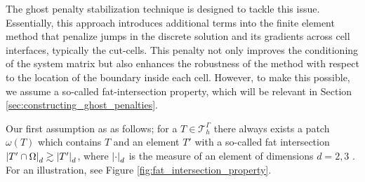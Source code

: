 The ghost penalty stabilization technique is designed to tackle this issue. Essentially, this approach introduces additional terms into the finite element method that penalize jumps in the discrete solution and its gradients across cell interfaces,
typically the cut-cells. This penalty not only improves the conditioning of the system matrix but also enhances the robustness of the method with respect to the location of the boundary inside each cell. However, to make this possible, we assume a
so-called fat-intersection property, which will be relevant in Section \ref{sec:constructing_ghost_penalties}.

Our first assumption as as follows;
for a $T \in \mathcal{T} ^{\Gamma }_{h}$ there always exists a patch $\omega ( T) $ which contains $T$ and an element $T'$ with a so-called fat intersection $
        \left\lvert  T' \cap \Omega   \right\rvert _{d} \gtrsim \left\lvert  T'  \right\rvert _{d}$, where $\left\lvert  \cdot   \right\rvert_{d} $ is the measure of an element of dimensions $d =2,3  $ . For an illustration, see Figure \ref{fig:fat_intersection_property}.

